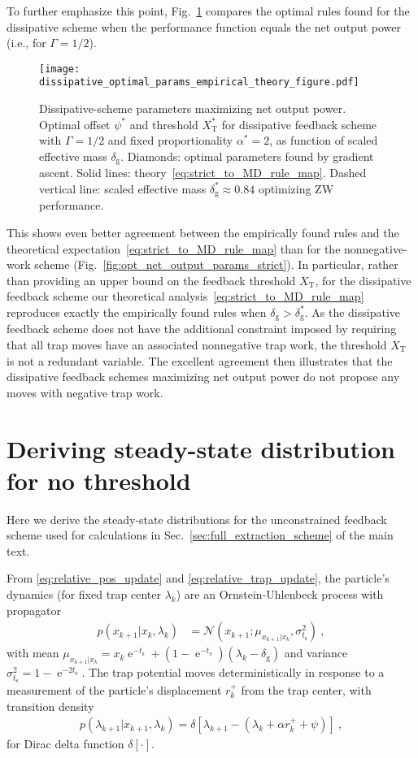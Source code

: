 \documentclass[%
reprint,
bibnotes, amsmath, amssymb, aps, pre,
 showkeys,
floatfix
]{revtex4-2}
\newcommand{\mrm}{\mathrm}
\newcommand{\mcal}{\mathcal}
\newcommand{\pr}[1]{\left(#1\right)} %
\newcommand{\sr}[1]{\left[#1\right]} %
\newcommand{\dg}{\delta_{\mrm{g}}}
\newcommand{\ts}{t_{\mrm{s}}}
\newcommand{\xk}{x_{k}}
\newcommand{\xkp}{x_{k+1}}
\newcommand{\lk}{\lambda_{k}}
\newcommand{\lkp}{\lambda_{k+1}}
\newcommand{\xkpr}{r_{k}^{+}}
\newcommand{\xT}{X_{\mrm{T}}}
\DeclareMathOperator{\e}{e}
\begin{document}
To further emphasize this point, Fig.~\ref{fig:diss_opt_net_output_params} compares the optimal rules found for the dissipative scheme when the performance function equals the net output power (i.e., for $\Gamma = 1/2$). 
\begin{figure}[!htbp]
    \centering  
    \texttt{[image: dissipative\_optimal\_params\_empirical\_theory\_figure.pdf]}
    \caption{
        Dissipative-scheme parameters maximizing net output power.
        Optimal offset $\psi^{*}$ and threshold $\xT^{*}$ for dissipative feedback scheme with $\Gamma=1/2$ and fixed proportionality $\alpha^{*}=2$, as function of scaled effective mass $\dg$. 
        Diamonds: optimal parameters found by gradient ascent. 
        Solid lines: theory~\eqref{eq:strict_to_MD_rule_map}.
        Dashed vertical line: scaled effective mass $\dg^{*}\approx 0.84$ optimizing ZW performance.
        }
    \label{fig:diss_opt_net_output_params}
\end{figure}
This shows even better agreement between the empirically found rules and the theoretical expectation~\eqref{eq:strict_to_MD_rule_map} than for the nonnegative-work scheme (Fig.~\ref{fig:opt_net_output_params_strict}).
In particular, rather than providing an upper bound on the feedback threshold $\xT$, for the dissipative feedback scheme our theoretical analysis~\eqref{eq:strict_to_MD_rule_map} reproduces exactly the empirically found rules when $\dg > \dg^{*}$. 
As the dissipative feedback scheme does not have the additional constraint imposed by requiring that all trap moves have an associated nonnegative trap work, the threshold $\xT$ is not a redundant variable. 
The excellent agreement then illustrates that the dissipative feedback schemes maximizing net output power do not propose any moves with negative trap work.


\section{Deriving steady-state distribution for no threshold}
\label{sec:ss_deriv}

Here we derive the steady-state distributions for the unconstrained feedback scheme used for calculations in Sec.~\ref{sec:full_extraction_scheme} of the main text.

From \eqref{eq:relative_pos_update} and \eqref{eq:relative_trap_update}, the particle's dynamics (for fixed trap center $\lk$) are an Ornstein-Uhlenbeck process with propagator
\begin{align}
    p\pr{\xkp|\xk,\lk} &= \mcal{N}\pr{\xkp; \mu_{\xkp|\xk}, \sigma_{\ts}^{2}}\ ,
\end{align}
with mean $\mu_{\xkp|\xk} = \xk\e^{-\ts} + \pr{1-\e^{-\ts}}\pr{\lk-\dg}$ and variance $\sigma_{\ts}^{2} = 1-\e^{-2\ts}$. 
The trap potential moves deterministically in response to a measurement of the particle's displacement $\xkpr$ from the trap center, with transition density
\begin{align}
    p\pr{\lkp|\xkp,\lk} = \delta\sr{\lkp-\pr{\lk + \alpha\xkpr + \psi}}\ ,
\end{align}
for Dirac delta function $\delta[\cdot]$.
\end{document}
